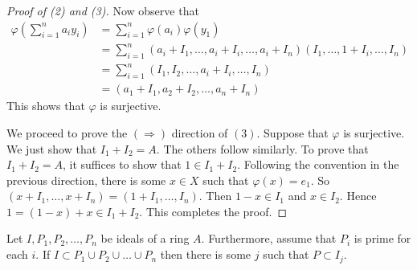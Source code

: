 \begin{proof}[Proof of (2) and (3)]
    Now observe that
    \begin{align*}
	\varphi \left( \sum_{i=1}^{n} a_i y_i \right) &= \sum_{i=1}^{n} \varphi (a_i) \varphi (y_1) \\
	&= \sum_{i=1}^{n} \left( a_i + I_1 , \ldots , a_i +I_i, \ldots , a_i +I_n \right) \left( I_1, \ldots , 1+I_i , \ldots , I_n \right) \\
	&= \sum_{i=1}^n \left( I_1 , I_2 , \ldots, a_i +I_i , \ldots, I_n \right) \\
	&= \left( a_1 + I_1 , a_2 + I_2 ,\ldots , a_n + I_n \right)
    \end{align*}
    This shows that $\varphi$ is surjective.

    We proceed to prove the $\left( \Rightarrow \right)$ direction of $(3)$.  Suppose that $\varphi$ is surjective. We just show that $I_1 + I_2 = A$. The others follow similarly. To prove that $I_1 + I_2 = A$, it suffices to show that $1\in I_1 +I_2$. Following the convention in the previous direction, there is some $x\in X$ such that $\varphi (x) =e_1$. So $\left( x+I_1 , \ldots , x+I_n \right) = \left( 1+I_1 , \ldots , I_n \right)$. Then $1-x\in I_1$ and $x \in I_2$. Hence $1= (1-x)+ x\in I_1 + I_2$. This completes the proof.
\end{proof}

\begin{lemma}
    Let $I, P_1, P_2, \ldots, P_n$ be ideals of a ring $A$. Furthermore, assume that $P_i$ is prime for each $i$. If $I \subset P_1 \cup P_2 \cup \ldots \cup P_n$ then there is some $j$ such that $P \subset I_j$.
    \label{lemma:prime-avoidance}
\end{lemma}
